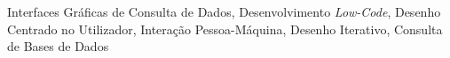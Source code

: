 



\begin{keywords}
Interfaces Gráficas de Consulta de Dados, Desenvolvimento \textit{Low-Code}, Desenho Centrado no Utilizador, Interação Pessoa-Máquina, Desenho Iterativo, Consulta de Bases de Dados
\end{keywords}

